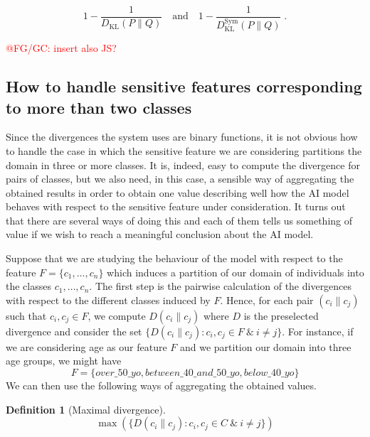 \documentclass[
]{ceurart}
\newtheorem{definition}{Definition}
\begin{document}
\[
1-\frac{1}{D_{\mathrm{KL}}(P\parallel Q)} \quad\text{and}\quad 1-\frac{1}{D^{\mathrm{Sym}}_{\mathrm{KL}}(P\parallel Q)}\;.
\]

%


\textcolor{red}{@FG/GC: insert also JS?}


\subsection{How to handle sensitive features corresponding to more than two classes}


Since the divergences the system uses are binary functions, it is not obvious how to handle the case in which the sensitive feature we are considering partitions the domain in three or more classes. It is, indeed, easy to compute the divergence for pairs of classes, but we also need, in this case, a sensible way of aggregating the obtained results in order to obtain one value describing well how the AI model behaves with respect to the sensitive feature under consideration. It turns out that there are several ways of doing this and each of them tells us something of value if we wish to reach a meaningful conclusion about the AI model.

Suppose that we are studying the behaviour of the model with respect to the feature $F=\{c_1, \ldots , c_n\}$ which induces a partition of our domain of individuals into the classes $c_1, \ldots , c_n$. The first step is the pairwise calculation of the divergences with respect to the different classes induced by $F$. Hence, for each pair $(c_i\parallel c_j)$ such that $c_i, c_j\in F$, we compute $D(c_i\parallel c_j) $ where $D$ is the  preselected divergence and consider the set $\{D(c_i\parallel c_j) : c_i,c_j\in F\ \&\ i\neq j\}$. For instance, if we are considering age as our feature  $F$ and we partition our domain into three age groups, we might have
\[F=\{over\_50\_yo, between\_40\_and\_50\_yo, below\_40\_yo\}\]
We can then use the following ways of aggregating the obtained values.

\begin{definition}[Maximal divergence]

$$\max (\{D(c_i\parallel c_j): c_i,c_j\in C\ \&\ i\neq j\})$$
\end{definition}
\end{document}
